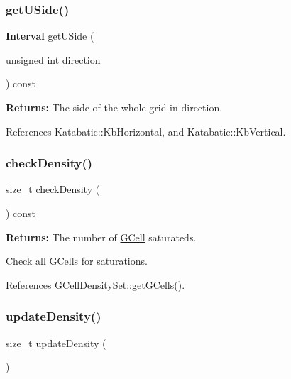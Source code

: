 \subsubsection{\texorpdfstring{get\+U\+Side()}{getUSide()}}
{\footnotesize\ttfamily \textbf{ Interval} get\+U\+Side (\begin{DoxyParamCaption}\item[{unsigned int}]{direction }\end{DoxyParamCaption}) const}

{\bfseries Returns\+:} The side of the whole grid in {\ttfamily direction}. 

References Katabatic\+::\+Kb\+Horizontal, and Katabatic\+::\+Kb\+Vertical.

\mbox{\label{classKatabatic_1_1GCellGrid_a88208864ba2268689946a8cb7a86fcb2}} 
\subsubsection{\texorpdfstring{check\+Density()}{checkDensity()}}
{\footnotesize\ttfamily size\+\_\+t check\+Density (\begin{DoxyParamCaption}{ }\end{DoxyParamCaption}) const}

{\bfseries Returns\+:} The number of \hyperlink{classKatabatic_1_1GCell}{G\+Cell} saturateds.

Check all G\+Cells for saturations. 

References G\+Cell\+Density\+Set\+::get\+G\+Cells().

\mbox{\label{classKatabatic_1_1GCellGrid_a9b3455dce10eb98d0496175dd586528c}} 
\subsubsection{\texorpdfstring{update\+Density()}{updateDensity()}}
{\footnotesize\ttfamily size\+\_\+t update\+Density (\begin{DoxyParamCaption}{ }\end{DoxyParamCaption})}

